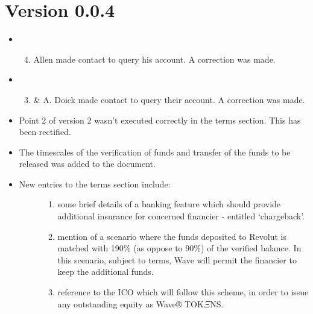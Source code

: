\documentclass[letterpaper,10pt,openany,oneside,english]{sphinxmanual}
\begin{document}
\section{Version 0.0.4}
\label{\detokenize{releasenotes:version-0-0-4}}\begin{itemize}
\item {} \begin{enumerate}
\setcounter{enumi}{3}
\item {} 
Allen made contact to query his account. A correction was made.

\end{enumerate}

\item {} \begin{enumerate}
\setcounter{enumi}{2}
\item {} 
\& A. Doick made contact to query their account. A correction was made.

\end{enumerate}

\item {} 
Point 2 of version 2 wasn’t executed correctly in the terms section. This has been rectified.

\item {} 
The timescales of the verification of funds and transfer of the funds to be released was added to the document.

\item {} \begin{description}
\item[{New entries to the terms section include:}] \leavevmode\begin{enumerate}
\item {} 
some brief details of a banking feature which should provide additional insurance for concerned financier - entitled ‘chargeback’.

\item {} 
mention of a scenario where the funds deposited to Revolut is matched with 190\% (as oppose to 90\%) of the verified balance. In this scenario, subject to terms, Wave will permit the financier to keep the additional funds.

\item {} 
reference to the ICO which will follow this scheme, in order to issue any outstanding equity as Wave® TOK\(\Xi\)NS.

\end{enumerate}

\end{description}

\end{itemize}
\end{document}
